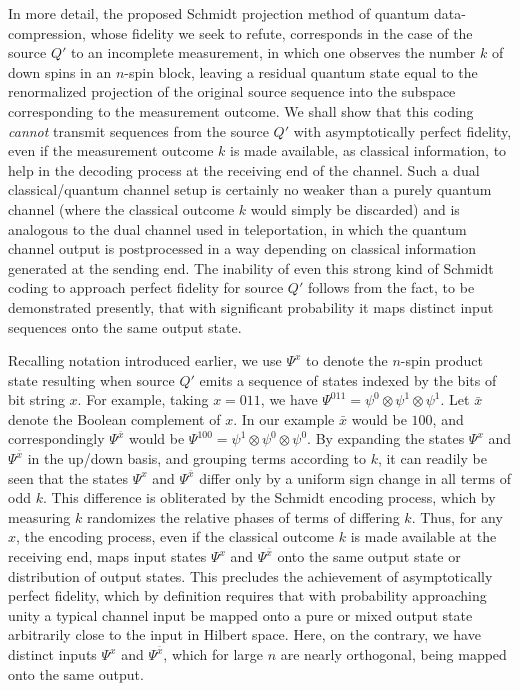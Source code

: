  
In more detail, the proposed Schmidt projection method of quantum data-compression, whose
fidelity we seek to refute, corresponds in the case of the
source $Q'$ to an incomplete
measurement, in which one observes the number $k$ of down
spins in an $n$-spin block, leaving a residual quantum state
equal to the renormalized projection of the original source
sequence into the subspace corresponding to the measurement
outcome.  We shall show that this coding {\em cannot\/}
transmit sequences from the source $Q'$ with asymptotically
perfect fidelity, even if the measurement outcome $k$ is made
available, as classical information, to help in the decoding
process at the receiving end of the channel.  Such a dual
classical/quantum channel setup is certainly no weaker than a
purely quantum channel (where the classical outcome $k$ would
simply be discarded) and is analogous to the dual channel used in
teleportation, in which the quantum channel output is
postprocessed in a way depending on classical information
generated at the sending end.  The inability of even this strong
kind of Schmidt coding to approach perfect fidelity for source
$Q'$ follows from the fact, to be demonstrated presently, that
with significant probability it maps distinct input sequences
onto the same output state.
 
Recalling notation introduced earlier,  we use $\Psi^x$ to denote
the $n$-spin product state resulting when source $Q'$ emits a
sequence of states indexed by the bits of bit string $x$.  For example,
taking $x=011$, we have $\Psi^{011} = \psi^0 \otimes \psi^1
\otimes \psi^1$.  Let $\bar{x}$ denote the Boolean complement of
$x$.  In our example $\bar{x}$ would be $100$, and
correspondingly $\Psi^{\bar{x}}$ would be $\Psi^{100} = \psi^1
\otimes \psi^0 \otimes \psi^0$.  By expanding the states $\Psi^x$
and $\Psi^{\bar{x}}$ in the up/down basis, and grouping terms
according to $k$, it can readily be seen that the states $\Psi^x$
and $\Psi^{\bar{x}}$ differ only by a uniform sign change in all
terms of odd $k$.  This difference is obliterated by the Schmidt
encoding process, which by measuring $k$ randomizes the relative
phases of terms of differing $k$.  Thus, for any $x$, the
encoding process, even if the classical outcome $k$
is made available at the receiving end, maps input states
$\Psi^x$ and $\Psi^{\bar{x}}$ onto the same output state or
distribution of output states.  This precludes the achievement of
asymptotically perfect fidelity, which by definition requires
that with probability approaching unity a typical channel input
be mapped onto a pure or mixed output state arbitrarily close to
the input in Hilbert space.  Here, on the contrary, we have
distinct inputs $\Psi^x$ and $\Psi^{\bar{x}}$, which for large $n$
are nearly orthogonal, being mapped onto the same output.
 
